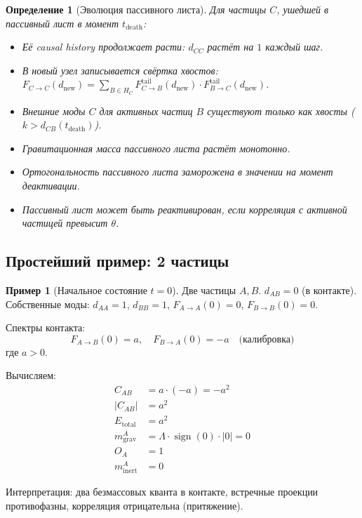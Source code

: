 \documentclass[11pt,a4paper]{article}
\newtheorem{definition}{Определение}[section]
\theoremstyle{definition}
\newtheorem{example}{Пример}[section]
\begin{document}
\begin{definition}[Эволюция пассивного листа]
Для частицы $C$, ушедшей в пассивный лист в момент $t_{\text{death}}$:
\begin{itemize}
    \item Её causal history продолжает расти: $d_{CC}$ растёт на $1$ каждый шаг.
    \item В новый узел записывается свёртка хвостов: $F_{C \to C}(d_{\text{new}}) = \sum_{B \in H_C} F_{C \to B}^{\text{tail}}(d_{\text{new}}) \cdot F_{B \to C}^{\text{tail}}(d_{\text{new}})$.
    \item Внешние моды $C$ для активных частиц $B$ существуют только как хвосты ($k > d_{CB}(t_{\text{death}})$).
    \item Гравитационная масса пассивного листа растёт монотонно.
    \item Ортогональность пассивного листа заморожена в значении на момент деактивации.
    \item Пассивный лист может быть реактивирован, если корреляция с активной частицей превысит $\theta$.
\end{itemize}
\end{definition}

\subsection{Простейший пример: 2 частицы}

\begin{example}[Начальное состояние $t=0$]
Две частицы $A, B$. $d_{AB} = 0$ (в контакте).
Собственные моды: $d_{AA} = 1$, $d_{BB} = 1$, $F_{A \to A}(0) = 0$, $F_{B \to B}(0) = 0$.

Спектры контакта:
\begin{equation}
    F_{A \to B}(0) = a, \quad F_{B \to A}(0) = -a \quad \text{(калибровка)}
\end{equation}
где $a > 0$.

Вычисляем:
\begin{align}
    C_{AB} &= a \cdot (-a) = -a^2 \\
    |C_{AB}| &= a^2 \\
    E_{\text{total}} &= a^2 \\
    m_{\text{grav}}^A &= \Lambda \cdot \operatorname{sign}(0) \cdot |0| = 0 \\
    O_A &= 1 \\
    m_{\text{inert}}^A &= 0
\end{align}

Интерпретация: два безмассовых кванта в контакте, встречные проекции противофазны, корреляция отрицательна (притяжение).
\end{example}
\end{document}

